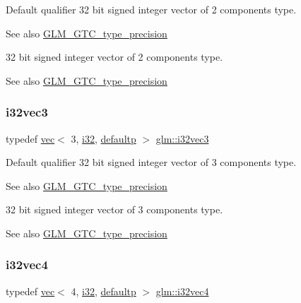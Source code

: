 Default qualifier 32 bit signed integer vector of 2 components type. \begin{DoxySeeAlso}{See also}
\hyperlink{group__gtc__type__precision}{G\+L\+M\+\_\+\+G\+T\+C\+\_\+type\+\_\+precision}
\end{DoxySeeAlso}
32 bit signed integer vector of 2 components type. \begin{DoxySeeAlso}{See also}
\hyperlink{group__gtc__type__precision}{G\+L\+M\+\_\+\+G\+T\+C\+\_\+type\+\_\+precision} 
\end{DoxySeeAlso}
\mbox{\label{group__gtc__type__precision_ga9811a4ec26e517ea85c785d3f3f4baac}} 
\subsubsection{\texorpdfstring{i32vec3}{i32vec3}}
{\footnotesize\ttfamily typedef \hyperlink{structglm_1_1vec}{vec}$<$ 3, \hyperlink{group__gtc__type__precision_ga1d8ed5c43e91ea7d4528389da4fa9524}{i32}, \hyperlink{namespaceglm_a36ed105b07c7746804d7fdc7cc90ff25a9d21ccd8b5a009ec7eb7677befc3bf51}{defaultp} $>$ \hyperlink{group__gtc__type__precision_ga9811a4ec26e517ea85c785d3f3f4baac}{glm\+::i32vec3}}

Default qualifier 32 bit signed integer vector of 3 components type. \begin{DoxySeeAlso}{See also}
\hyperlink{group__gtc__type__precision}{G\+L\+M\+\_\+\+G\+T\+C\+\_\+type\+\_\+precision}
\end{DoxySeeAlso}
32 bit signed integer vector of 3 components type. \begin{DoxySeeAlso}{See also}
\hyperlink{group__gtc__type__precision}{G\+L\+M\+\_\+\+G\+T\+C\+\_\+type\+\_\+precision} 
\end{DoxySeeAlso}
\mbox{\label{group__gtc__type__precision_ga78c16dde5527264e8085b375efba6f28}} 
\subsubsection{\texorpdfstring{i32vec4}{i32vec4}}
{\footnotesize\ttfamily typedef \hyperlink{structglm_1_1vec}{vec}$<$ 4, \hyperlink{group__gtc__type__precision_ga1d8ed5c43e91ea7d4528389da4fa9524}{i32}, \hyperlink{namespaceglm_a36ed105b07c7746804d7fdc7cc90ff25a9d21ccd8b5a009ec7eb7677befc3bf51}{defaultp} $>$ \hyperlink{group__gtc__type__precision_ga78c16dde5527264e8085b375efba6f28}{glm\+::i32vec4}}

